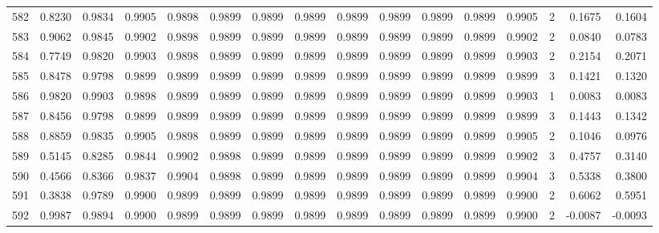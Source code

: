 \begin{tabular}{lrrrrrrrrrrrrrrr}
582 &      0.8230 &  0.9834 &  0.9905 &  0.9898 &  0.9899 &  0.9899 &  0.9899 &  0.9899 &  0.9899 &  0.9899 &   0.9899 &     0.9905 &      2 &                    0.1675 &                     0.1604 \\
583 &      0.9062 &  0.9845 &  0.9902 &  0.9898 &  0.9899 &  0.9899 &  0.9899 &  0.9899 &  0.9899 &  0.9899 &   0.9899 &     0.9902 &      2 &                    0.0840 &                     0.0783 \\
584 &      0.7749 &  0.9820 &  0.9903 &  0.9898 &  0.9899 &  0.9899 &  0.9899 &  0.9899 &  0.9899 &  0.9899 &   0.9899 &     0.9903 &      2 &                    0.2154 &                     0.2071 \\
585 &      0.8478 &  0.9798 &  0.9899 &  0.9899 &  0.9899 &  0.9899 &  0.9899 &  0.9899 &  0.9899 &  0.9899 &   0.9899 &     0.9899 &      3 &                    0.1421 &                     0.1320 \\
586 &      0.9820 &  0.9903 &  0.9898 &  0.9899 &  0.9899 &  0.9899 &  0.9899 &  0.9899 &  0.9899 &  0.9899 &   0.9899 &     0.9903 &      1 &                    0.0083 &                     0.0083 \\
587 &      0.8456 &  0.9798 &  0.9899 &  0.9899 &  0.9899 &  0.9899 &  0.9899 &  0.9899 &  0.9899 &  0.9899 &   0.9899 &     0.9899 &      3 &                    0.1443 &                     0.1342 \\
588 &      0.8859 &  0.9835 &  0.9905 &  0.9898 &  0.9899 &  0.9899 &  0.9899 &  0.9899 &  0.9899 &  0.9899 &   0.9899 &     0.9905 &      2 &                    0.1046 &                     0.0976 \\
589 &      0.5145 &  0.8285 &  0.9844 &  0.9902 &  0.9898 &  0.9899 &  0.9899 &  0.9899 &  0.9899 &  0.9899 &   0.9899 &     0.9902 &      3 &                    0.4757 &                     0.3140 \\
590 &      0.4566 &  0.8366 &  0.9837 &  0.9904 &  0.9898 &  0.9899 &  0.9899 &  0.9899 &  0.9899 &  0.9899 &   0.9899 &     0.9904 &      3 &                    0.5338 &                     0.3800 \\
591 &      0.3838 &  0.9789 &  0.9900 &  0.9899 &  0.9899 &  0.9899 &  0.9899 &  0.9899 &  0.9899 &  0.9899 &   0.9899 &     0.9900 &      2 &                    0.6062 &                     0.5951 \\
592 &      0.9987 &  0.9894 &  0.9900 &  0.9899 &  0.9899 &  0.9899 &  0.9899 &  0.9899 &  0.9899 &  0.9899 &   0.9899 &     0.9900 &      2 &                   -0.0087 &                    -0.0093 \\

\end{tabular}
